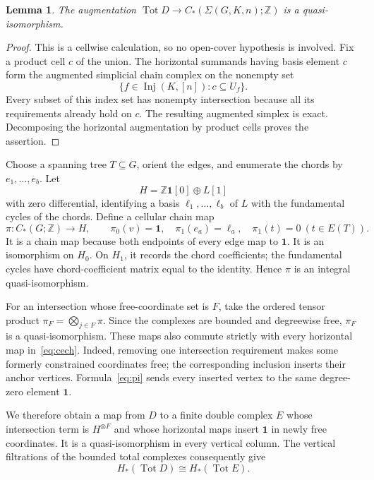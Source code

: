 \documentclass[11pt]{article}
\newtheorem{lemma}[theorem]{Lemma}
\newcommand{\Z}{\mathbb Z}
\newcommand{\inj}{\operatorname{Inj}}
\newcommand{\Tot}{\operatorname{Tot}}
\begin{document}
\begin{lemma}\label{lem:augmentation}
The augmentation $\Tot D\to C_*(\Sigma(G,K,n);\Z)$ is a quasi-isomorphism.
\end{lemma}

\begin{proof}
This is a cellwise calculation, so no open-cover hypothesis is involved.  Fix a product cell $c$ of the union.  The horizontal summands having basis element $c$ form the augmented simplicial chain complex on the nonempty set
\[
 \{f\in\inj(K,[n]):c\subseteq U_f\}.
\]
Every subset of this index set has nonempty intersection because all its requirements already hold on $c$.  The resulting augmented simplex is exact.  Decomposing the horizontal augmentation by product cells proves the assertion.
\end{proof}

Choose a spanning tree $T\subseteq G$, orient the edges, and enumerate the chords by $e_1,\ldots,e_b$.  Let
\[
 H=\Z\mathbf 1[0]\oplus L[1]
\]
with zero differential, identifying a basis $\ell_1,\ldots,\ell_b$ of $L$ with the fundamental cycles of the chords.  Define a cellular chain map
\begin{equation}\label{eq:pi}
 \pi:C_*(G;\Z)\longrightarrow H,
 \qquad
 \pi_0(v)=\mathbf1,
 \quad \pi_1(e_a)=\ell_a,
 \quad \pi_1(t)=0\ (t\in E(T)).
\end{equation}
It is a chain map because both endpoints of every edge map to $\mathbf1$.  It is an isomorphism on $H_0$.  On $H_1$, it records the chord coefficients; the fundamental cycles have chord-coefficient matrix equal to the identity.  Hence $\pi$ is an integral quasi-isomorphism.

For an intersection whose free-coordinate set is $F$, take the ordered tensor product $\pi_F=\bigotimes_{j\in F}\pi$.  Since the complexes are bounded and degreewise free, $\pi_F$ is a quasi-isomorphism.  These maps also commute strictly with every horizontal map in~\eqref{eq:cech}.  Indeed, removing one intersection requirement makes some formerly constrained coordinates free; the corresponding inclusion inserts their anchor vertices.  Formula~\eqref{eq:pi} sends every inserted vertex to the same degree-zero element $\mathbf1$.

We therefore obtain a map from $D$ to a finite double complex $E$ whose intersection term is $H^{\otimes F}$ and whose horizontal maps insert $\mathbf1$ in newly free coordinates.  It is a quasi-isomorphism in every vertical column.  The vertical filtrations of the bounded total complexes consequently give
\begin{equation}\label{eq:total-qiso}
 H_*(\Tot D)\cong H_*(\Tot E).
\end{equation}
\end{document}
